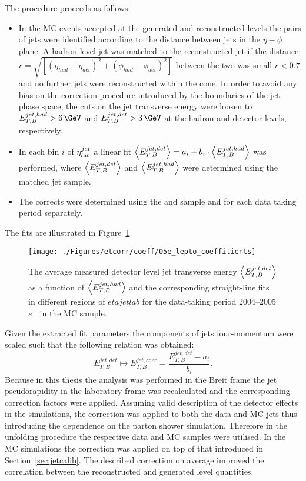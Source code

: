 The procedure proceeds as follows:
\begin{itemize}
 \item In the MC events accepted at the generated and reconstructed levels the pairs of jets were identified according to the distance between jets in the $\eta-\phi$ plane. A hadron level jet was matched to the reconstructed jet if the distance $r=\sqrt{\left[\left(\eta_{had}-\eta_{det}\right)^2 + \left(\phi_{had}-\phi_{det}\right)^2\right]}$ between the two was small $r<0.7$ and no further jets were reconstructed within the cone. In order to avoid any bias on the correction procedure introduced by the boundaries of the jet phase space, the cuts on the jet transverse energy were loosen to $\etjetbhad>6\,\GeV$ and $\etjetbdet>3\,\GeV$ at the hadron and detector levels, respectively.
 \item In each bin $i$ of $\mbox{$\eta^{jet}_{lab}$}$ a linear fit $\left\langle\mbox{$E_{T,B}^{jet,det}$}\right\rangle = a_i + b_i\cdot\left\langle\mbox{$E_{T,B}^{jet,had}$}\right\rangle$ was performed, where $\left\langle\mbox{$E_{T,B}^{jet,det}$}\right\rangle$ and $\left\langle\mbox{$E_{T,B}^{jet,had}$}\right\rangle$ were determined using the matched jet sample.
 \item The corrects were determined using the \ariadne and \lepto sample and for each data taking period separately. 
\end{itemize}
The fits are illustrated in Figure~\ref{fig:05e_lepto_coeffitients}.
\begin{figure}[p]
\centering
\texttt{[image: ./Figures/etcorr/coeff/05e\_lepto\_coeffitients]}
\caption{The average measured detector level jet transverse energy $\left\langle\mbox{$E_{T,B}^{jet,det}$}\right\rangle$ as a function of $\left\langle\mbox{$E_{T,B}^{jet,had}$}\right\rangle$ and the corresponding straight-line fits in different regions of $etajetlab$ for the data-taking period 2004--2005$e^-$ in the \lepto MC sample.}
\label{fig:05e_lepto_coeffitients}
\end{figure}

Given the extracted fit parameters the components of jets four-momentum were scaled such that the following relation was obtained:
 \begin{equation}
  E_{T,B}^{jet,det} \mapsto E_{T,B}^{jet,corr} = \frac{E_{T,B}^{jet,det} - a_i}{b_i}.
 \end{equation}
Because in this thesis the analysis was performed in the Breit frame the jet pseudorapidity in the laboratory frame was recalculated and the corresponding correction factors were applied. Assuming valid description of the detector effects in the simulations, the correction was applied to both the data and MC jets thus introducing the dependence on the parton shower simulation. Therefore in the unfolding procedure the respective data and MC samples were utilised. In the MC simulations the correction was applied on top of that introduced in Section~\ref{sec:jetcalib}. The described correction on average improved the correlation between the reconstructed and generated level quantities.
